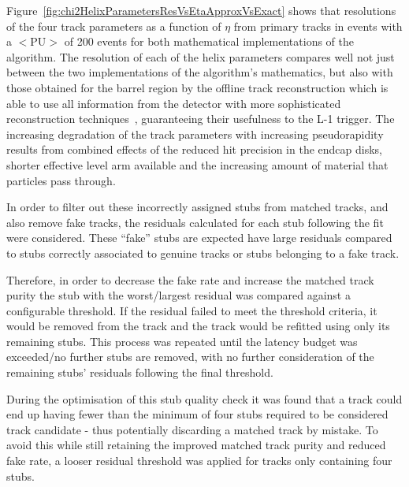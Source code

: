 
Figure~\ref{fig:chi2HelixParametersResVsEtaApproxVsExact} shows that resolutions of the four track parameters as a function of $\eta$ from primary tracks in \ttbar events with a $<\textrm{PU}>$ of 200 events for both mathematical implementations of the algorithm.
The resolution of each of the helix parameters compares well not just between the two implementations of the algorithm's mathematics, but also with those obtained for the barrel region by the offline track reconstruction which is able to use all information from the detector with more sophisticated reconstruction techniques~\cite{P2TrackerTDR}, guaranteeing their usefulness to the L-1 trigger.
The increasing degradation of the track parameters with increasing pseudorapidity results from combined effects of the reduced hit precision in the endcap disks, shorter effective level arm available and the increasing amount of material that particles pass through.

In order to filter out these incorrectly assigned stubs from matched tracks, and also remove fake tracks, the residuals calculated for each stub following the fit were considered.
These ``fake'' stubs are expected have large residuals compared to stubs correctly associated to genuine tracks or stubs belonging to a fake track.

Therefore, in order to decrease the fake rate and increase the matched track purity the stub with the worst/largest residual was compared against a configurable threshold.
If the residual failed to meet the threshold criteria, it would be removed from the track and the track would be refitted using only its remaining stubs.
This process was repeated until the latency budget was exceeded/no further stubs are removed, with no further consideration of the remaining stubs' residuals following the final threshold.

During the optimisation of this stub quality check it was found that a track could end up having fewer than the minimum of four stubs required to be considered track candidate - thus potentially discarding a matched track by mistake.
To avoid this while still retaining the improved matched track purity and reduced fake rate, a looser residual threshold was applied for tracks only containing four stubs.


